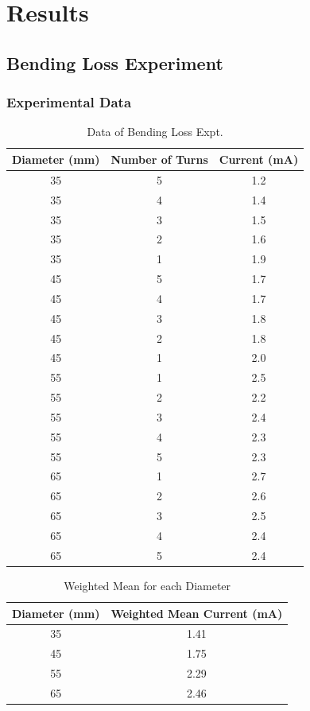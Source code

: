 
\chapter{\label{chap:res}Results}%


\section{\label{sec:res_fig_plot}Bending Loss Experiment}

\subsection{Experimental Data}
\begin{table}[H]
         \centering
        \begin{tabular}{|c|c|c|}
             \hline
        \textbf{Diameter (mm)} & \textbf{Number of Turns} & \textbf{Current (mA)} \\
        \hline
        35 & 5 & 1.2 \\
        35 & 4 & 1.4 \\
        35 & 3 & 1.5 \\
        35 & 2 & 1.6 \\
        35 & 1 & 1.9 \\
        \hline
        45 & 5 & 1.7 \\
        45 & 4 & 1.7 \\
        45 & 3 & 1.8 \\
        45 & 2 & 1.8 \\
        45 & 1 & 2.0 \\
        \hline
        55 & 1 & 2.5 \\
        55 & 2 & 2.2 \\
        55 & 3 & 2.4 \\
        55 & 4 & 2.3 \\
        55 & 5 & 2.3 \\
        \hline
        65 & 1 & 2.7 \\
        65 & 2 & 2.6 \\
        65 & 3 & 2.5 \\
        65 & 4 & 2.4 \\
        65 & 5 & 2.4 \\
        \hline
    \end{tabular}
    \caption{Data of Bending Loss Expt.}
    \end{table}

     \begin{table}[H]
    \centering
    \begin{tabular}{|c|c|}
        \hline
        \textbf{Diameter (mm)} & \textbf{Weighted Mean Current (mA)} \\
            \hline
            35 & 1.41 \\
            45 & 1.75 \\
            55 & 2.29 \\
            65 & 2.46 \\
            \hline
        \end{tabular}
        \caption{Weighted Mean for each Diameter}
    \end{table}
